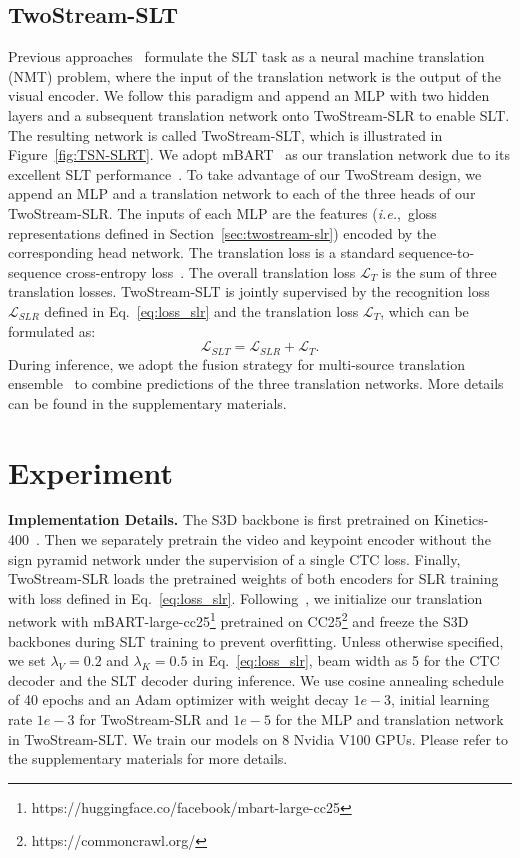 \documentclass{article}
\def\ie{\emph{i.e.}} \def\Ie{\emph{I.e.}}
\begin{document}
\subsection{TwoStream-SLT}
\label{sec:twostream-slt}
Previous approaches~\cite{camgoz2018neural, camgoz2020sign, li2020tspnet, STMC_MM, zhou2021improving,MMTLB_2022} formulate the SLT task as a neural machine translation (NMT) problem, where the input of the translation network is the output of the visual encoder. We follow this paradigm and append an MLP with two hidden layers and a subsequent translation network onto TwoStream-SLR to enable SLT. The resulting network is called TwoStream-SLT, which is illustrated in Figure~\ref{fig:TSN-SLRT}. We adopt mBART~\cite{liu2020multilingual} as our translation network due to its excellent SLT performance~\cite{MMTLB_2022}. To take advantage of our TwoStream design, we append an MLP and a translation network to each of the three heads of our TwoStream-SLR. The inputs of each MLP are the features (\ie,~gloss representations defined in Section~\ref{sec:twostream-slr}) encoded by the corresponding head network. The translation loss is a standard sequence-to-sequence cross-entropy loss~\cite{vaswani2017attention}. The overall translation loss $\mathcal{L}_{T}$ is the sum of three translation losses. TwoStream-SLT is jointly supervised by the recognition loss $\mathcal{L}_{SLR}$ defined in Eq.~\ref{eq:loss_slr} and the translation loss $\mathcal{L}_{T}$, which can be formulated as:
 \begin{equation}
 \label{eq:loss_slt}
     \mathcal{L}_{SLT} = \mathcal{L}_{SLR} + \mathcal{L}_{T}.
 \end{equation}
During inference, we adopt the fusion strategy for multi-source translation ensemble~\cite{firat2016zero} to combine predictions of the three translation networks. More details can be found in the supplementary materials.  
 \section{Experiment}
\noindent \textbf{Implementation Details.} 
The S3D backbone is first pretrained on Kinetics-400~\cite{kay2017kinetics}. Then we separately pretrain the video and keypoint encoder without the sign pyramid network under the supervision of a single CTC loss. Finally, TwoStream-SLR loads the pretrained weights of both encoders for SLR training with loss defined in Eq.~\ref{eq:loss_slr}. Following~\cite{MMTLB_2022}, we initialize our translation network with mBART-large-cc25\footnote[2]{https://huggingface.co/facebook/mbart-large-cc25} pretrained on CC25\footnote[3]{https://commoncrawl.org/} and freeze the S3D backbones during SLT training to prevent overfitting. Unless otherwise specified, we set $\lambda_V=0.2$ and $\lambda_K=0.5$ in Eq.~\ref{eq:loss_slr}, beam width as 5 for the CTC decoder and the SLT decoder during inference. We use cosine annealing schedule of 40 epochs and an Adam optimizer with weight decay $1e-3$, initial learning rate $1e-3$ for TwoStream-SLR and $1e-5$ for the MLP and translation network in TwoStream-SLT. We train our models on 8 Nvidia V100 GPUs. Please refer to the supplementary materials for more details.
\end{document}
